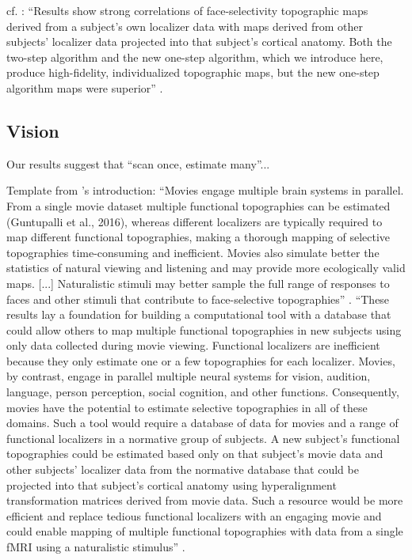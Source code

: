 %
cf. \citep{jiahui2020predicting}: ``Results show strong correlations of
face-selectivity topographic maps derived from a subject's own localizer data
with maps derived from other subjects' localizer data projected into that
subject's cortical anatomy. Both the two-step algorithm and the new one-step
algorithm, which we introduce here, produce high-fidelity, individualized
topographic maps, but the new one-step algorithm maps were superior''
\citep{jiahui2020predicting}.


\subsection{Vision}



Our results suggest that ``scan once, estimate many''...

%
Template from \citet{jiahui2020predicting}'s introduction: ``Movies engage
multiple brain systems in parallel. From a single movie dataset multiple
functional topographies can be estimated (Guntupalli et al., 2016), whereas
different localizers are typically required to map different functional
topographies, making a thorough mapping of selective topographies time-consuming
and inefficient. Movies also simulate better the statistics of natural viewing
and listening and may provide more ecologically valid maps. [...] Naturalistic
stimuli may better sample the full range of responses to faces and other stimuli
that contribute to face-selective topographies'' \citep{jiahui2020predicting}.
%
``These results lay a foundation for building a computational tool with a
database that could allow others to map multiple functional topographies in new
subjects using only data collected during movie viewing. Functional localizers
are inefficient because they only estimate one or a few topographies for each
localizer. Movies, by contrast, engage in parallel multiple neural systems for
vision, audition, language, person perception, social cognition, and other
functions.  Consequently, movies have the potential to estimate selective
topographies in all of these domains. Such a tool would require a database of
data for movies and a range of functional localizers in a normative group of
subjects. A new subject's functional topographies could be estimated based only
on that subject's movie data and other subjects' localizer data from the
normative database that could be projected into that subject's cortical anatomy
using hyperalignment transformation matrices derived from movie data. Such a
resource would be more efficient and replace tedious functional localizers with
an engaging movie and could enable mapping of multiple functional topographies
with data from a single fMRI using a naturalistic stimulus''
\citet{jiahui2020predicting}.


